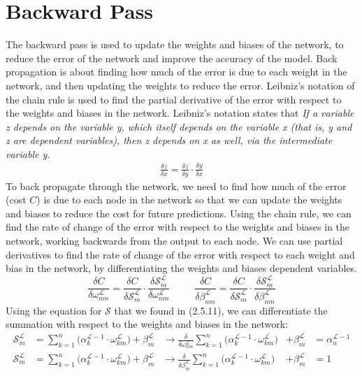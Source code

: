 \documentclass{report}
\begin{document}
\section{Backward Pass}
The backward pass is used to update the weights and biases of the network, to reduce the error of the network and improve the accuracy of the model.
Back propagation is about finding how much of the error is due to each weight in the network, and then updating the weights to reduce the error.
\vspace{1em}
\newline
Leibniz's notation of the chain rule is used to find the partial derivative of the error with respect to the weights and biases in the network.
Leibniz's notation states that \textit{If a variable z depends on the variable y, which itself depends on the variable x (that is, y and z are dependent variables), then z depends on x as well, via the intermediate variable y.}
\begin{align}
    \frac{\delta z}{\delta x} = \frac{\delta z}{\delta y}\cdot\frac{\delta y}{\delta x}
\end{align}
\vspace{1em}
\newline
To back propagate through the network, we need to find how much of the error (cost $C$) is due to each node in the network so that we can update the weights and biases to reduce the cost for future predictions.
Using the chain rule, we can find the rate of change of the error with respect to the weights and biases in the network, working backwards from the output to each node.
We can use partial derivatives to find the rate of change of the error with respect to each weight and bias in the network, by differentiating the weights and biases dependent variables.
\begin{equation}
    \frac{\delta C}{\delta \omega^{\mathcal{L}}_{nm}} = \frac{\delta C}{\delta \mathcal{S}^{\mathcal{L}}_m}\cdot\frac{\delta \mathcal{S}^{\mathcal{L}}_m}{\delta \omega^{\mathcal{L}}_{nm}} \hspace{30pt}
    \frac{\delta C}{\delta \beta^{\mathcal{L}}_{nm}} = \frac{\delta C}{\delta \mathcal{S}^{\mathcal{L}}_m}\cdot\frac{\delta \mathcal{S}^{\mathcal{L}}_m}{\delta \beta^{\mathcal{L}}_{nm}}
\end{equation}
Using the equation for $\mathcal{S}$ that we found in (2.5.11), we can differentiate the summation with respect to the weights and biases in the network:
\begin{align}
    \mathcal{S}^{\mathcal{L}}_{m} &= \sum_{k=1}^{n} \Big( \alpha_k^{\mathcal{L}-1}\cdot\omega^{\mathcal{L}}_{km} \Big) + \beta^{\mathcal{L}}_{m} &\rightarrow
    \frac{\delta}{\delta \omega^{\mathcal{L}}_{nm}} \sum_{k=1}^{n} \Big( \alpha_k^{\mathcal{L}-1}\cdot\omega^{\mathcal{L}}_{km} \Big) &+ \beta^{\mathcal{L}}_{m} &=
    \alpha_{n}^{\mathcal{L}-1}\\
    \mathcal{S}^{\mathcal{L}}_{m} &= \sum_{k=1}^{n} \Big( \alpha_k^{\mathcal{L}-1}\cdot\omega^{\mathcal{L}}_{km} \Big) + \beta^{\mathcal{L}}_{m} &\rightarrow
    \frac{\delta}{\delta \beta ^{\mathcal{L}}_{m}} \sum_{k=1}^{n} \Big( \alpha_k^{\mathcal{L}-1}\cdot\omega^{\mathcal{L}}_{km} \Big) &+ \beta^{\mathcal{L}}_{m} &= 1
\end{align}
\end{document}
